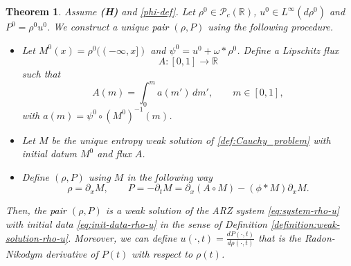 \documentclass[11pt,a4paper,oneside]{amsart}
\newtheorem{theorem}[definition]{Theorem}
\newcommand\R{\mathbb{R}}
\newcommand{\PP}{\mathcal{P}}
\begin{document}
\begin{theorem}\label{th:weak_sol_ARZ}
Assume \textbf{(H)} and \eqref{phi-def}. Let $\rho^0\in\PP_c(\R)$, $u^0\in L^\infty(d\rho^0)$ and $P^0=\rho^0 u^0$. 
We construct a unique \textcolor{black}{pair} $(\rho,P)$ using the following procedure.
    \begin{itemize}
        \item[\textbf{(i)}] Let $M^0(x)=\rho^0((-\infty,x])$ and $\psi^0=u^0+\omega\ast\rho^0$. Define a Lipschitz flux $$A:[0,1]\to\R$$ such that
        \begin{equation}\label{def:A-eps-integral-formula}
            A(m)=\int_0^m a(m')\,dm',\qquad m\in[0,1],
        \end{equation}
        with $a(m)=\psi^0\circ(M^0)^{-1}(m)$.
        \item[\textbf{(ii)}] Let $M$ be the unique entropy weak solution of \eqref{def:Cauchy_problem} with initial datum $M^0$ and flux $A$.
        \item[\textbf{(iii)}] Define $(\rho,P)$ using $M$ in the following way
        \begin{equation}\label{def:rho-P-via-M}
            \rho=\partial_x M,\qquad P=-\partial_t M=\partial_x(A\circ M)-(\phi\ast M)\partial_x M.
        \end{equation}
    \end{itemize}
Then, the \textcolor{black}{pair} $(\rho,P)$ is a weak solution of the ARZ system \eqref{eq:system-rho-u} with initial data \eqref{eq:init-data-rho-u} 
in the sense of Definition \ref{definition:weak-solution-rho-u}. Moreover, we can define $u(\cdot,t)=\frac{dP(\cdot,t)}{d\rho(\cdot,t)}$ 
that is the Radon-Nikodym derivative of $P(t)$ with respect to $\rho(t)$.
\end{theorem}
\end{document}
